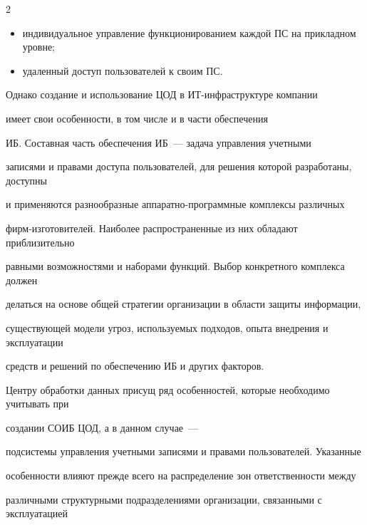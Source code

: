\begin{multicols}{2}
\begin{itemize}
централизованное управление функционированием центра на уровне ресурсов, 


осуществляемое в интересах всех эксплуатируемых ПС;


       \item 


индивидуальное управление функционированием каждой ПС на прикладном уровне;


       \item 


удаленный доступ пользователей к своим ПС.


\end{itemize}





       Однако создание и использование ЦОД в ИТ-ин\-фра\-струк\-ту\-ре компании 


имеет свои особен\-ности, в том числе и в части обеспечения 


ИБ. Со\-став\-ная часть обеспечения ИБ~--- задача управления учетными 


записями и правами доступа пользователей, для решения которой разработаны, доступны 


и применяются разнообразные ап\-па\-рат\-но-про\-грам\-мные комплексы различных 


фирм-изготовителей. Наиболее распространенные из них обладают приблизительно 


равными возможностями и наборами функций. Выбор конкретного комплекса должен 


делаться на основе общей стратегии организации в области защиты информации, 


существующей модели угроз, используемых подходов, опыта внедрения и эксплуатации 


средств и решений по обеспечению ИБ и других факторов.


       


       Центру обработки данных присущ ряд особенностей, которые необходимо учитывать при 


создании  СОИБ ЦОД, а в данном случае~--- 


под\-сис\-те\-мы управ\-ле\-ния учетными записями и правами пользователей. Указанные 


особенности влияют прежде всего на распределение зон ответственности между 


различными структурными подразделениями организации, связанными с эксплуатацией 



\end{multicols}
